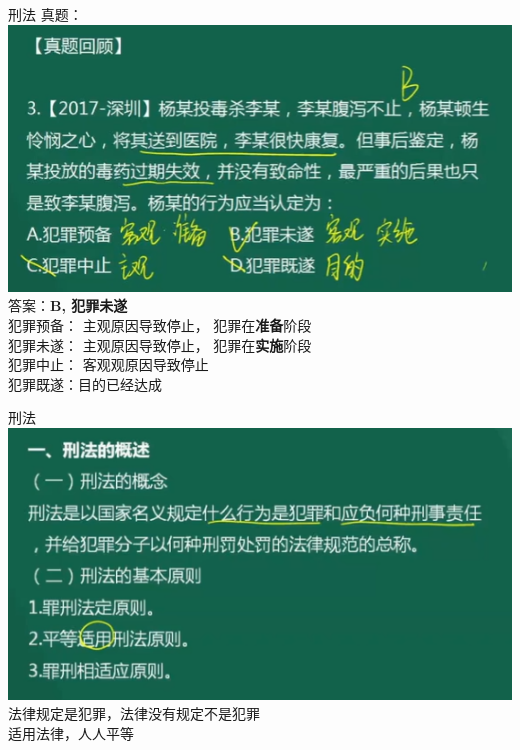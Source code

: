 \documentclass[aspectratio=169]{beamer}
\begin{document}
\begin{frame}[t]{刑法}
    真题：\\
    \includegraphics[scale=0.25]{criminal_law_002A}\\ 
    答案：\textbf{B, 犯罪未遂}\\
犯罪预备： 主观原因导致停止， 犯罪在\textbf{准备}阶段\\
犯罪未遂： 主观原因导致停止， 犯罪在\textbf{实施}阶段\\
犯罪中止： 客观观原因导致停止 \\
犯罪既遂：目的已经达成 \\
\end{frame}



\begin{frame}[t]{刑法}
    \includegraphics[scale=0.4]{criminal_law_basic}\\ 
    法律规定是犯罪，法律没有规定不是犯罪\\
    适用法律，人人平等\\
\end{frame}
\end{document}
